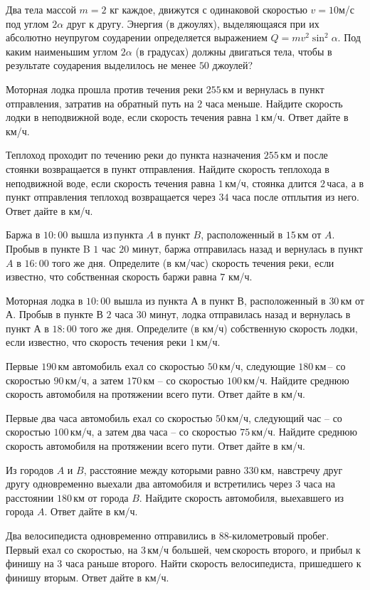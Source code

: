 \begin{class}[number=2]
	\begin{listofex}
		\item Два тела массой \( m=2 \) кг каждое, движутся с одинаковой скоростью  \( v =10  \)м/с под углом \( 2\alpha \)  друг к другу. Энергия (в джоулях), выделяющаяся при их абсолютно неупругом соударении определяется выражением \( Q=mv^2\sin^2\alpha \). Под каким наименьшим углом \( 2\alpha \) (в градусах) должны двигаться тела, чтобы в результате соударения выделилось не менее \( 50 \) джоулей?
		\item Моторная лодка прошла против течения реки \( 255 \) км и вернулась в пункт отправления, затратив на обратный путь на \( 2 \) часа меньше. Найдите скорость лодки в неподвижной воде, если скорость течения равна \( 1 \) км/ч. Ответ дайте в км/ч.
		\item Теплоход проходит по течению реки до пункта назначения \( 255 \) км и после стоянки возвращается в пункт отправления. Найдите скорость теплохода в неподвижной воде, если скорость течения равна \( 1 \) км/ч, стоянка длится \( 2 \) часа, а в пункт отправления теплоход возвращается через \( 34 \) часа после отплытия из него. Ответ дайте в км/ч.
		\item Баржа в \( 10:00 \) вышла из пункта \( A \) в пункт \( B \), расположенный в \( 15 \) км от \( A \). Пробыв в пункте B \( 1 \) час \( 20 \) минут, баржа отправилась назад и вернулась в пункт \( A \) в \( 16:00 \) того же дня. Определите (в км/час) скорость течения реки, если известно, что собственная скорость баржи равна \( 7 \) км/ч.
		\item Моторная лодка в \( 10:00 \) вышла из пункта \( А \) в пункт \( В \), расположенный в \( 30 \) км от \( А \). Пробыв в пункте \( В \) \( 2 \) часа \( 30 \) минут, лодка отправилась назад и вернулась в пункт \( А \) в \( 18:00 \) того же дня. Определите (в км/ч) собственную скорость лодки, если известно, что скорость течения реки \( 1 \) км/ч.
		\item Первые \( 190 \) км автомобиль ехал со скоростью \( 50 \) км/ч, следующие \( 180 \) км -- со скоростью \( 90 \) км/ч, а затем \( 170 \) км -- со скоростью \( 100 \) км/ч. Найдите среднюю скорость автомобиля на протяжении всего пути. Ответ дайте в км/ч.
		\item Первые два часа автомобиль ехал со скоростью \( 50 \) км/ч, следующий час -- со скоростью \( 100 \) км/ч, а затем два часа -- со скоростью \( 75 \) км/ч. Найдите среднюю скорость автомобиля на протяжении всего пути. Ответ дайте в км/ч.
		\item Из городов \( A \) и \( B \), расстояние между которыми равно \( 330 \) км, навстречу друг другу одновременно выехали два автомобиля и встретились через \( 3 \) часа на расстоянии \( 180 \) км от города \( B \). Найдите скорость автомобиля, выехавшего из города \( A \). Ответ дайте в км/ч.
		\item Два велосипедиста одновременно отправились в \( 88 \)-километровый пробег. Первый ехал со скоростью, на \( 3 \) км/ч большей, чем скорость второго, и прибыл к финишу на \( 3 \) часа раньше второго. Найти скорость велосипедиста, пришедшего к финишу вторым. Ответ дайте в км/ч.
	\end{listofex}
\end{class}
